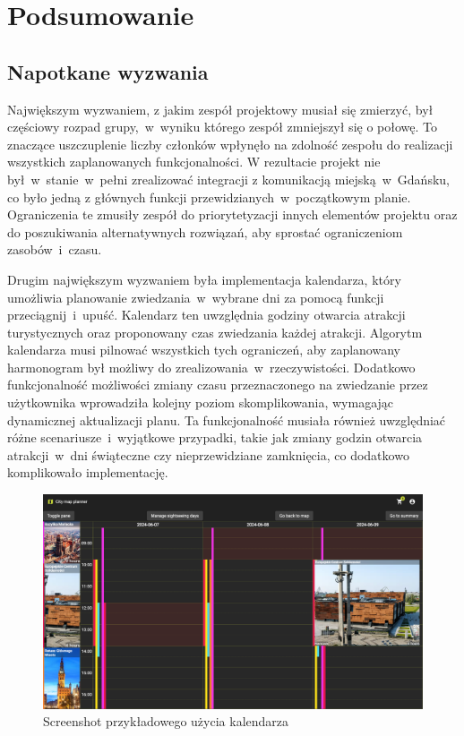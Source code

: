 
\chapter{Podsumowanie}
\label{ch:podsumowanie}

\section{Napotkane wyzwania}
\label{sec:napotkane-wyzwania}

Największym wyzwaniem, z jakim zespół projektowy musiał się zmierzyć, był częściowy rozpad grupy,~w~wyniku którego zespół zmniejszył się o połowę.
To znaczące uszczuplenie liczby członków wpłynęło na zdolność zespołu do realizacji wszystkich zaplanowanych funkcjonalności.
W rezultacie projekt nie był~w~stanie~w~pełni zrealizować integracji z komunikacją miejską~w~Gdańsku, co było jedną z głównych funkcji przewidzianych~w~początkowym planie.
Ograniczenia te zmusiły zespół do priorytetyzacji innych elementów projektu oraz do poszukiwania alternatywnych rozwiązań, aby sprostać ograniczeniom zasobów~i~czasu.

Drugim największym wyzwaniem była implementacja kalendarza, który umożliwia planowanie zwiedzania~w~wybrane dni za pomocą funkcji przeciągnij~i~upuść.
Kalendarz ten uwzględnia godziny otwarcia atrakcji turystycznych oraz proponowany czas zwiedzania każdej atrakcji.
Algorytm kalendarza musi pilnować wszystkich tych ograniczeń, aby zaplanowany harmonogram był możliwy do zrealizowania~w~rzeczywistości.
Dodatkowo funkcjonalność  możliwości zmiany czasu przeznaczonego na zwiedzanie przez użytkownika wprowadziła kolejny poziom skomplikowania, wymagając dynamicznej aktualizacji planu.
Ta funkcjonalność musiała również uwzględniać różne scenariusze~i~wyjątkowe przypadki, takie jak zmiany godzin otwarcia atrakcji~w~dni świąteczne czy nieprzewidziane zamknięcia, co dodatkowo komplikowało implementację.

\begin{figure}[H]
    \centering
    \includegraphics[width=1\textwidth]{attachments/t1}
    \caption{Screenshot przykładowego użycia kalendarza}
\end{figure}

